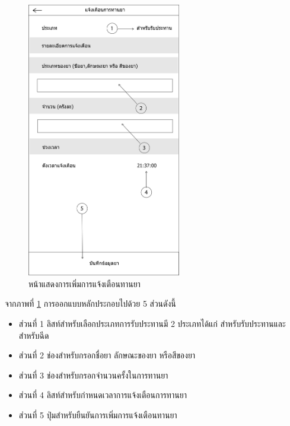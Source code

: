 		\begin{figure}[H]
			\centering
			\includegraphics[width=0.6\textwidth]{Figures/3/UI/addnotification}
			\caption{หน้าแสดงการเพิ่มการแจ้งเตือนทานยา}
			\label{Fig:เพิ่มทานยา}
		\end{figure}
		จากภาพที่ \ref{Fig:เพิ่มทานยา} การออกแบบหลักประกอบไปด้วย 5 ส่วนดังนี้
		\begin{itemize}
			\item ส่วนที่ 1 ลิสท์สำหรับเลือกประเภทการรับประทานมี 2 ประเภทได้แก่ สำหรับรับประทานและสำหรับฉีด
			\item ส่วนที่ 2 ช่องสำหรับกรอกชื่อยา ลักษณะของยา หรือสีของยา
			\item ส่วนที่ 3 ช่องสำหรับกรอกจำนวนครั้งในการทานยา
			\item ส่วนที่ 4 ลิสท์สำหรับกำหนดเวลาการแจ้งเตือนการทานยา
			\item ส่วนที่ 5 ปุ่มสำหรับยืนยันการเพิ่มการแจ้งเตือนทานยา
		\end{itemize}

